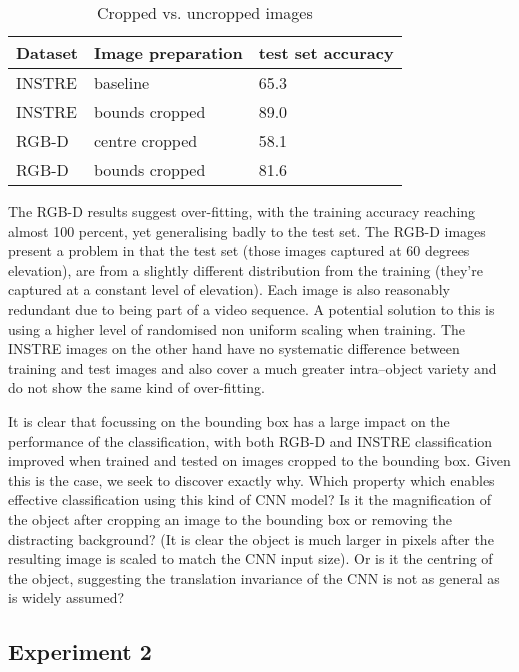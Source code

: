\begin{table}[h]
  \centering
    \caption{Cropped vs. uncropped images }
    
  \begin{tabular}{ l l l }
    
    Dataset & Image preparation & test set accuracy \\
    \toprule
    
    INSTRE & baseline &  65.3 \\
    INSTRE & bounds cropped & 89.0 \\
    
    RGB-D & centre cropped & 58.1 \\
    RGB-D & bounds cropped & 81.6 \\
    
    \bottomrule
  \end{tabular}
\label{fig:crop}
\end{table}

The RGB-D results suggest over-fitting, with the training accuracy reaching almost 100 percent, yet generalising badly to the test set. The RGB-D images present a problem in that the test set (those images captured at 60 degrees elevation), are from a slightly different distribution from the training (they're captured at a constant level of elevation). Each image is also reasonably redundant due to being part of a video sequence. A potential solution to this is using a higher level of randomised non uniform scaling when training. The INSTRE images on the other hand have no systematic difference between training and test images and also cover a much greater intra--object variety and do not show the same kind of over-fitting.

It is clear that focussing on the bounding box has a large impact on the performance of the classification, with both RGB-D and INSTRE classification improved when trained and tested on images cropped to the bounding box. Given this is the case, we seek to discover exactly why. Which property which enables effective classification using this kind of CNN model? Is it the magnification of the object after cropping an image to the bounding box or removing the distracting background? (It is clear the object is much larger in pixels after the resulting image is scaled to match the CNN input size). Or is it the centring of the object, suggesting the translation invariance of the CNN is not as general as is widely assumed?


\subsection {Experiment 2}

